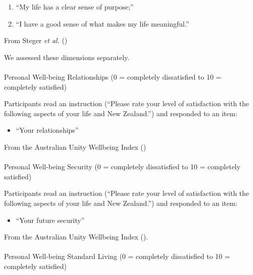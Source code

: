 \documentclass[
  single column]{article}
\makeatletter
\let\oldparagraph\paragraph
\renewcommand{\paragraph}{
    \@ifstar
      \xxxParagraphStar
      \xxxParagraphNoStar
  }
\newcommand{\xxxParagraphStar}[1]{\oldparagraph*{#1}\mbox{}}
\newcommand{\xxxParagraphNoStar}[1]{\oldparagraph{#1}\mbox{}}
\providecommand{\tightlist}{%
  \setlength{\itemsep}{0pt}\setlength{\parskip}{0pt}}\usepackage{longtable,booktabs,array}
\makeatother
\begin{document}
\begin{enumerate}
\def\labelenumi{(\arabic{enumi})}
\tightlist
\item
  ``My life has a clear sense of purpose;''
\item
  ``I have a good sense of what makes my life meaningful.''
\end{enumerate}

From Steger \emph{et al.} ()

We assessed these dimensions separately.

\paragraph{Personal Well-being Relationships (0 = completely
dissatisfied to 10 = completely
satisfied)}\label{personal-well-being-relationships-0-completely-dissatisfied-to-10-completely-satisfied}

Participants read an instruction (``Please rate your level of
satisfaction with the following aspects of your life and New Zealand.'')
and responded to an item:

\begin{itemize}
\tightlist
\item
  ``Your relationships''
\end{itemize}

From the Australian Unity Wellbeing Index
()

\paragraph{Personal Well-being Security (0 = completely dissatisfied to
10 = completely
satisfied)}\label{personal-well-being-security-0-completely-dissatisfied-to-10-completely-satisfied}

Participants read an instruction (``Please rate your level of
satisfaction with the following aspects of your life and New Zealand.'')
and responded to an item:

\begin{itemize}
\tightlist
\item
  ``Your future security''
\end{itemize}

From the Australian Unity Wellbeing Index
().

\paragraph{Personal Well-being Standard Living (0 = completely
dissatisfied to 10 = completely
satisfied)}\label{personal-well-being-standard-living-0-completely-dissatisfied-to-10-completely-satisfied}
\end{document}
